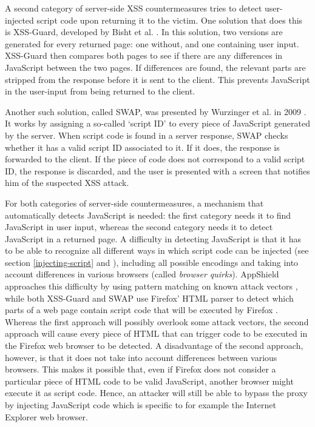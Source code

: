 A second category of server-side XSS countermeasures tries to detect user-injected script code upon returning it to the victim. One solution that does this is XSS-Guard, developed by Bisht et al. \cite{Bisht2008}. In this solution, two versions are generated for every returned page: one without, and one containing user input. XSS-Guard then compares both pages to see if there are any differences in JavaScript between the two pages. If differences are found, the relevant parts are stripped from the response before it is sent to the client. This prevents JavaScript in the user-input from being returned to the client.

Another such solution, called SWAP, was presented by Wurzinger et al. in 2009 \cite{Wurzinger2009}. It works by assigning a so-called `script ID' to every piece of JavaScript generated by the server. When script code is found in a server response, SWAP checks whether it has a valid script ID associated to it. If it does, the response is forwarded to the client. If the piece of code does not correspond to a valid script ID, the response is discarded, and the user is presented with a screen that notifies him of the suspected XSS attack.

For both categories of server-side countermeasures, a mechanism that automatically detects JavaScript is needed: the first category needs it to find JavaScript in user input, whereas the second category needs it to detect JavaScript in a returned page. A difficulty in detecting JavaScript is that it has to be able to recognize all different ways in which script code can be injected (see section \ref{injecting-script} and \cite{Jim2007}), including all possible encodings and taking into account differences in various browsers (called \emph{browser quirks}). AppShield approaches this difficulty by using pattern matching on known attack vectors \cite{Klein2002}, while both XSS-Guard and SWAP use Firefox' HTML parser to detect which parts of a web page contain script code that will be executed by Firefox \cite{Bisht2008,Wurzinger2009}. Whereas the first approach will possibly overlook some attack vectors, the second approach will cause every piece of HTML that can trigger code to be executed in the Firefox web browser to be detected. A disadvantage of the second approach, however, is that it does not take into account differences between various browsers. This makes it possible that, even if Firefox does not consider a particular piece of HTML code to be valid JavaScript, another browser might execute it as script code. Hence, an attacker will still be able to bypass the proxy by injecting JavaScript code which is specific to for example the Internet Explorer web browser.


